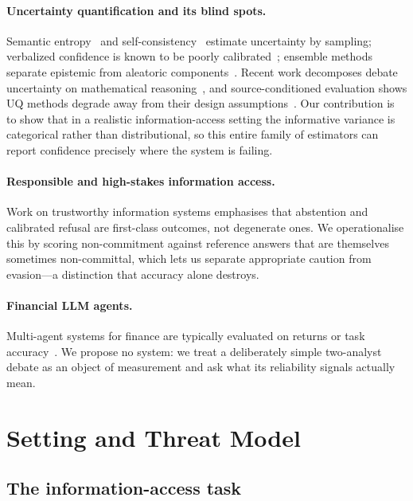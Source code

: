 \documentclass[sigconf,anonymous,review]{acmart}
\begin{document}
\paragraph{Uncertainty quantification and its blind spots.} Semantic
entropy~\cite{kuhn2023semantic,farquhar2024detecting} and
self-consistency~\cite{wang2023selfconsistency} estimate uncertainty by
sampling; verbalized confidence is known to be poorly
calibrated~\cite{xiong2024canllms}; ensemble methods separate epistemic from
aleatoric components~\cite{depeweg2018decomposition}. Recent work decomposes
debate uncertainty on mathematical reasoning~\cite{egac2026}, and
source-conditioned evaluation shows UQ methods degrade away from their
design assumptions~\cite{whydontyouknow2026}. Our contribution is to show
that in a realistic information-access setting the informative variance is
categorical rather than distributional, so this entire family of estimators
can report confidence precisely where the system is failing.

\paragraph{Responsible and high-stakes information access.} Work on
trustworthy information systems emphasises that abstention and calibrated
refusal are first-class outcomes, not degenerate ones. We operationalise this
by scoring non-commitment against reference answers that are themselves
sometimes non-committal, which lets us separate appropriate caution from
evasion---a distinction that accuracy alone destroys.

\paragraph{Financial LLM agents.} Multi-agent systems for finance are
typically evaluated on returns or task accuracy~\cite{tradingagents2024,
findebate2025}. We propose no system: we treat a deliberately simple
two-analyst debate as an object of measurement and ask what its reliability
signals actually mean.

\section{Setting and Threat Model}

\subsection{The information-access task}
\end{document}

